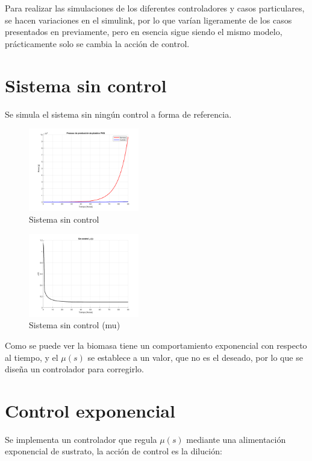 \documentclass[letterpaper, 10 pt, conference]{ieeeconf}  %
\begin{document}
Para realizar las simulaciones de los diferentes controladores y casos particulares, se hacen variaciones en el simulink, por lo que varían ligeramente de los casos presentados en previamente, pero en esencia sigue siendo el mismo modelo, prácticamente solo se cambia la acción de control.

\section{Sistema sin control}  
Se simula el sistema sin ningún control a forma de referencia.

\begin{figure}[H]
  \centering
  \includegraphics[width=0.43\textwidth]{./Images_tp3/sin_control.png}
  \caption{Sistema sin control}
\end{figure}
\begin{figure}[H]
  \centering
  \includegraphics[width=0.43\textwidth]{./Images_tp3/sin_control_mu.png}
  \caption{Sistema sin control (mu)}
\end{figure}

Como se puede ver la biomasa tiene un comportamiento exponencial con respecto al tiempo, y el $\mu(s)$ se establece a un valor, que no es el deseado, por lo que se diseña un controlador para corregirlo.

\section{Control exponencial}
Se implementa un controlador que regula \(\mu(s)\) mediante una alimentación exponencial de sustrato, la acción de control es la dilución:
\end{document}
